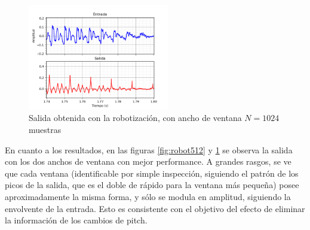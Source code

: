 \documentclass[assd_tp2_main.tex]{subfiles}
\begin{document}
\begin{figure}[ht]	
	\centering
	\includegraphics[width=0.55\textwidth]
	{graficos/EJ8/rochi/robotizacion_1024.png}
	\caption{Salida obtenida con la robotizaci\'on, con ancho de ventana $N=1024$ muestras}
	\label{fig:robot1024}
\end{figure}

En cuanto a los resultados, en las figuras \ref{fig:robot512} y \ref{fig:robot1024} se observa la salida con los dos anchos de ventana con mejor performance. A grandes rasgos, se ve que cada ventana (identificable por simple inspecci\'on, siguiendo el patr\'on de los picos de la salida, que es el doble de r\'apido para la ventana m\'as peque\~na) posee aproximadamente la misma forma, y s\'olo se modula en amplitud, siguiendo la envolvente de la entrada. Esto es consistente con el objetivo del efecto de eliminar la informaci\'on de los cambios de pitch.
\end{document}
